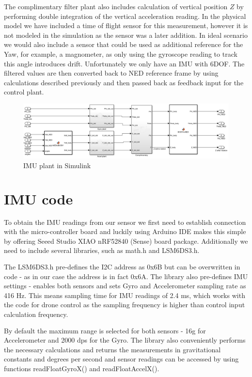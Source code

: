 The complimentary filter plant also includes calculation of vertical position $Z$ by performing double integration of the vertical acceleration reading. In the physical model we have included a time of flight sensor for this measurement, however it is not modeled in the simulation as the sensor was a later addition. In ideal scenario we would also include a sensor that could be used as additional reference for the Yaw, for example, a magnometer, as only using the gyroscope reading to track this angle introduces drift. Unfortunately we only have an IMU with 6DOF. 
The filtered values are then converted back to NED reference frame by using calculations described previously and then passed back as feedback input for the control plant.

\begin{figure}[H]
    \begin{center}
    \includegraphics[scale = 0.55]{pictures/IMU/IMU_plant.png}
    \end{center}
    \caption{IMU plant in Simulink}
    \label{fig:my_label}
\end{figure}

\section{IMU code}


To obtain the IMU readings from our sensor we first need to establish connection with the micro-controller board and luckily using Arduino IDE makes this simple by offering Seeed Studio XIAO nRF52840 (Sense) board package. Additionally we need to include several libraries, such as math.h and LSM6DS3.h. 

The LSM6DS3.h pre-defines the I2C address as 0x6B but can be overwritten in code - as in our case the address is in fact 0x6A. 
The library also pre-defines IMU settings - enables both sensors and sets Gyro and Accelerometer sampling rate as 416 Hz. This means sampling time for IMU readings of 2.4 ms, which works with the code for drone control as the sampling frequency is higher than control input calculation frequency. 

By default the maximum range is selected for both sensors - 16g for Accelerometer and 2000 dps for the Gyro. The library also conveniently performs the necessary calculations and returns the measurements in gravitational constants and degrees per second and sensor readings can be accessed by using functions readFloatGyroX() and readFloatAccelX().  

